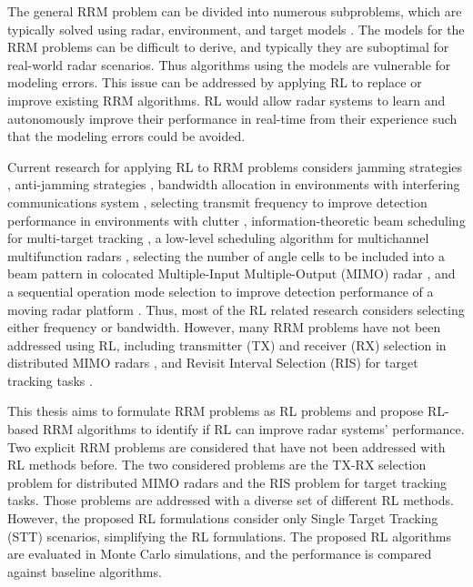 \documentclass[english, 12pt, a4paper, elec, utf8, a-1b, online]{aaltothesis}
\numberwithin{equation}{section}
\begin{document}
The general RRM problem can be divided into numerous subproblems, which are typically solved using radar, environment, and target models \cite{Moo2016, Koch1999, Krishnamurthy2001, Wintenby2006, LaScala2006, Rajkumar1997, Rajkumar1998, Kastella1997, Kreucher2004, Kreucher2005, Xu2010}.
The models for the RRM problems can be difficult to derive, and typically they are suboptimal for real-world radar scenarios. 
Thus algorithms using the models are vulnerable for modeling errors.
This issue can be addressed by applying RL to replace or improve existing RRM algorithms. 
RL would allow radar systems to learn and autonomously improve their performance in real-time from their experience such that the modeling errors could be avoided. 

Current research for applying RL to RRM problems considers
jamming strategies \cite{Qiang2017, Wang2019, Wang2019a, Zhang2019},
anti-jamming strategies \cite{Kang2018, Ak2019}, 
bandwidth allocation in environments with interfering communications system \cite{Selvi2018, Kozy2019},
selecting transmit frequency to improve detection performance in environments with clutter \cite{Wabeke2010}, 
information-theoretic beam scheduling for multi-target tracking \cite{Kreucher2005, Xu2010},
a low-level scheduling algorithm for multichannel multifunction radars \cite{Shaghaghi2018},
selecting the number of angle cells to be included into a beam pattern in colocated Multiple-Input Multiple-Output (MIMO) radar \cite{Wang2018}, 
and a sequential operation mode selection to improve detection performance of a moving radar platform \cite{Smits2008}.
Thus, most of the RL related research considers selecting either frequency or bandwidth. 
However, many RRM problems have not been addressed using RL, including transmitter (TX) and receiver (RX) selection in distributed MIMO radars \cite{Godrich2011a, Godrich2011, Sun2014}, and Revisit Interval Selection (RIS) for target tracking tasks \cite{Cohen1986, Gardner1988, Munu1992, ChengTing2007,Baek2010, Keuk1975, Watson1993, vanKeuk1993, Daeipour1994, Shin1995, Benoudnine2006, MasoumiGanjgah2017, Charlish2015}.

This thesis aims to formulate RRM problems as RL problems and propose RL-based RRM algorithms to identify if RL can improve radar systems' performance.
Two explicit RRM problems are considered that have not been addressed with RL methods before.
The two considered problems are the TX-RX selection problem for distributed MIMO radars and the RIS problem for target tracking tasks.
Those problems are addressed with a diverse set of different RL methods.
However, the proposed RL formulations consider only Single Target Tracking (STT) scenarios, simplifying the RL formulations. 
The proposed RL algorithms are evaluated in Monte Carlo simulations, and the performance is compared against baseline algorithms.
\end{document}
